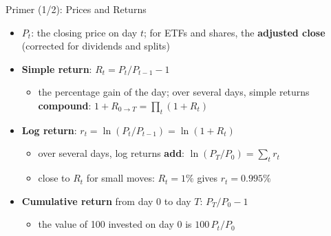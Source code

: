 \begin{frame}{Primer (1/2): Prices and Returns}
\itemsize{\small}
\begin{itemize}
    \item $P_t$: the closing price on day $t$; for ETFs and shares, the \textbf{adjusted close} (corrected for dividends and splits)
    \item \textbf{Simple return}: $R_t = P_t / P_{t-1} - 1$
    \begin{itemize}
        \item the percentage gain of the day; over several days, simple returns \textbf{compound}: $1 + R_{0\to T} = \prod_t (1 + R_t)$
    \end{itemize}
    \item \textbf{Log return}: $r_t = \ln(P_t / P_{t-1}) = \ln(1 + R_t)$
    \begin{itemize}
        \item over several days, log returns \textbf{add}: $\ln(P_T / P_0) = \sum_t r_t$
        \item close to $R_t$ for small moves: $R_t = 1\%$ gives $r_t = 0.995\%$
    \end{itemize}
    \item \textbf{Cumulative return} from day 0 to day $T$: $P_T / P_0 - 1$
    \begin{itemize}
        \item the value of 100 invested on day 0 is $100 \, P_t / P_0$
    \end{itemize}
\end{itemize}
\end{frame}

